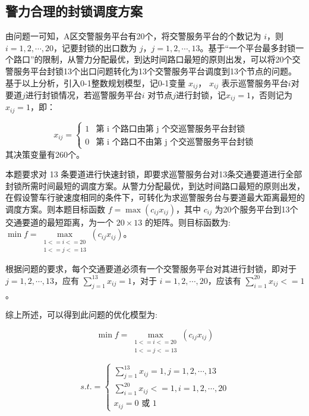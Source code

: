 \documentclass{cumcmthesis}
\begin{document}
  \subsection{警力合理的封锁调度方案}

    由问题一可知，A区交警服务平台有20个，将交警服务平台的个数记为 $i$，则 $i = 1, 2, \cdots, 20$，记要封锁的出口数为 $j$，$j = 1, 2, \cdots, 13$。基于“一个平台最多封锁一个路口”的限制，从警力分配最优，到达时间路口最短的原则出发，可以将20个交警服务平台封锁13个出口问题转化为13个交警服务平台调度到13个节点的问题。
    基于以上分析，引入0-1整数规划模型，记0-1变量 $x_{ij}$， $x_{ij}$ 表示巡警服务平台$i$对要道$j$进行封锁情况，若巡警服务平台$i$ 对节点$j$进行封锁，记$x_{ij} = 1$，否则记为$x_{ij} = 1$，即：

    \begin{equation}
      x_{ij} =
      \begin{cases}
        1 & \text{第 i 个路口由第 j 个交巡警服务平台封锁}   \\
        0 & \text{第 i 个路口不由第 j 个交巡警服务平台封锁}
      \end{cases}
    \end{equation}
    其决策变量有260个。

    本题要求对 13 条要道进行快速封锁，即要求巡警服务台对13条交通要道进行全部封锁所需时间最短的调度方案。从警力分配最优，到达时间路口最短的原则出发，在假设警车行驶速度相同的条件下，可转化为求巡警服务台与要道最大距离最短的调度方案。则本题目标函数 $f = \max{(c_{ij}x_{ij})}$，其中 $c_{ij}$ 为20个服务平台到13个交通要道的最短距离，为一个 $20 \times 13$ 的矩阵。则目标函数为: $\min f = \max\limits_{\substack{1<=i<=20\\1<=j<=13}}{(c_{ij}x_{ij})}
    $。


    根据问题的要求，每个交通要道必须有一个交警服务平台对其进行封锁，即对于$j = 1, 2, \cdots, 13$，应有 $\sum\limits_{j=1}^{13} x_{ij} = 1$，对于 $i = 1, 2, \cdots, 20$，应该有 $\sum\limits_{i=1}^{20} x_{ij} <= 1$。

    综上所述，可以得到此问题的优化模型为:

    \begin{equation}
      \min f = \max\limits_{\substack{1<=i<=20\\1<=j<=13}}{(c_{ij}x_{ij})}
    \end{equation}

    \begin{equation}
      s.t.=
      \begin{cases}
        \sum\limits_{j=1}^{13} x_{ij} = 1  , j = 1, 2, \cdots, 13 \\
        \sum\limits_{i=1}^{20} x_{ij} <= 1 , i = 1, 2, \cdots, 20 \\
        x_{ij} = \text{0 或 1}
      \end{cases}
    \end{equation}
\end{document}
